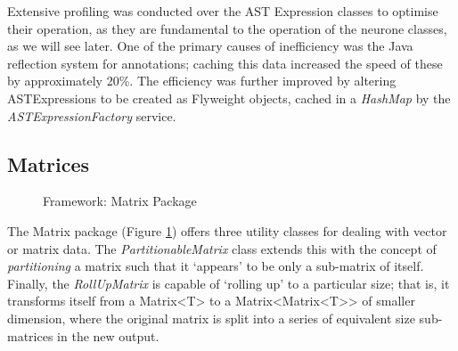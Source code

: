\documentclass{acm_proc_article-sp}
\begin{document}
{Extensive profiling was conducted over the AST Expression classes to optimise their operation, as they are fundamental to the operation of the neurone classes, as we will see later. One of the primary causes of inefficiency was the Java reflection system for annotations; caching this data increased the speed of these by approximately 20\%. The efficiency was further improved by altering ASTExpressions to be created as Flyweight objects, cached in a {\textit{HashMap}} by the {\textit{ASTExpressionFactory}} service.
}
\subsection{Matrices}
{
\begin{figure}[t]
\centering
{}
\caption{Framework: Matrix Package}
\label{fig:framework:matrix}
\end{figure}
The Matrix package (Figure \ref{fig:framework:matrix}) offers three utility classes for dealing with vector or matrix data. The {\textit{PartitionableMatrix}} class extends this with the concept of {\textit{partitioning}} a matrix such that it `appears' to be only a sub{}-matrix of itself. Finally, the {\textit{RollUpMatrix}} is capable of `rolling up' to a particular size; that is, it transforms itself from a Matrix\textless T\textgreater{} to a Matrix\textless Matrix\textless T\textgreater{}\textgreater{} of smaller dimension, where the original matrix is split into a series of equivalent size sub-matrices in the new output.
}
\end{document}
